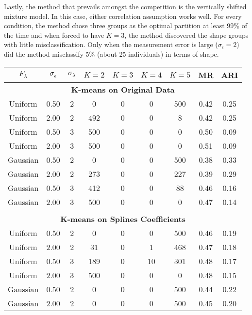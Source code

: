 Lastly, the method that prevails amongst the competition is the vertically shifted mixture model. In this case, either correlation assumption works well. For every condition, the method chose three groups as the optimal partition at least 99\% of the time and when forced to have $K=3$, the method discovered the shape groups with little misclassification. Only when the measurement error is large ($\sigma_{\epsilon}=2$) did the method misclassify 5\% (about 25 individuals) in terms of shape. 

\begin{table}[ht]
\begin{center}
\begin{tabular}{ccc|cccccc}
  \thickhline  $F_{\lambda}$&$\sigma_{\epsilon}$&$\sigma_{\lambda}$&$K=2$&$K=3$&$K=4$&$K=5$&MR&ARI\\ \hline\multicolumn{9}{c}{\textbf{K-means on Original Data}}\\ Uniform & 0.50 &   2 &   0 &   0 &   0 & 500 & 0.42 & 0.25 \\ 
  Uniform & 2.00 &   2 & 492 &   0 &   0 &   8 & 0.42 & 0.25 \\ 
  Uniform & 0.50 &   3 & 500 &   0 &   0 &   0 & 0.50 & 0.09 \\ 
  Uniform & 2.00 &   3 & 500 &   0 &   0 &   0 & 0.51 & 0.09 \\ 
  Gaussian & 0.50 &   2 &   0 &   0 &   0 & 500 & 0.38 & 0.33 \\ 
  Gaussian & 2.00 &   2 & 273 &   0 &   0 & 227 & 0.39 & 0.29 \\ 
  Gaussian & 0.50 &   3 & 412 &   0 &   0 &  88 & 0.46 & 0.16 \\ 
  Gaussian & 2.00 &   3 & 500 &   0 &   0 &   0 & 0.47 & 0.14 \\ 
   \\ \multicolumn{9}{c}{\textbf{K-means on Splines Coefficients}}\\Uniform & 0.50 &   2 &   0 &   0 &   0 & 500 & 0.46 & 0.19 \\ 
  Uniform & 2.00 &   2 &  31 &   0 &   1 & 468 & 0.47 & 0.18 \\ 
  Uniform & 0.50 &   3 & 189 &   0 &  10 & 301 & 0.48 & 0.17 \\ 
  Uniform & 2.00 &   3 & 500 &   0 &   0 &   0 & 0.48 & 0.15 \\ 
  Gaussian & 0.50 &   2 &   0 &   0 &   0 & 500 & 0.44 & 0.22 \\ 
  Gaussian & 2.00 &   2 &   0 &   0 &   0 & 500 & 0.45 & 0.20 \\ 

\end{tabular}
\end{center}
\end{table}
